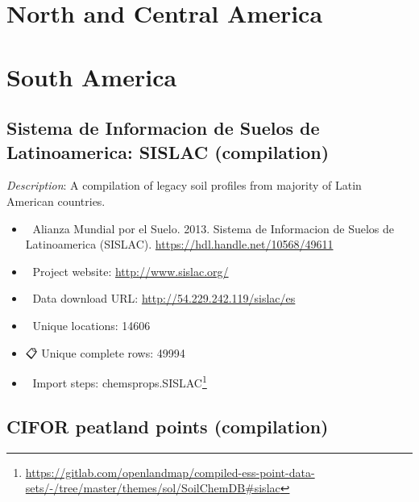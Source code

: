 \documentclass[
  graybox,natbib,nospthms]{svmono}
\providecommand{\tightlist}{%
  \setlength{\itemsep}{0pt}\setlength{\parskip}{0pt}}
\providecommand{\tightlist}{\setlength{\itemsep}{0pt}\setlength{\parskip}{0pt}}
\renewcommand{\href}[2]{#2 (\url{#1})}
\renewcommand{\href}[2]{#2\footnote{\url{#1}}}
\begin{document}
\hypertarget{north-and-central-america}{%
\section{North and Central America}\label{north-and-central-america}}

\hypertarget{south-america}{%
\section{South America}\label{south-america}}

\hypertarget{sistema-de-informacion-de-suelos-de-latinoamerica-sislac-compilation}{%
\subsection{Sistema de Informacion de Suelos de Latinoamerica: SISLAC (compilation)}\label{sistema-de-informacion-de-suelos-de-latinoamerica-sislac-compilation}}

\emph{Description}: A compilation of legacy soil profiles from majority of Latin American
countries.

\begin{itemize}
\tightlist
\item
  📕 Alianza Mundial por el Suelo. 2013. Sistema de Informacion de Suelos de Latinoamerica (SISLAC). \url{https://hdl.handle.net/10568/49611}\\
\item
  🔗 Project website: \url{http://www.sislac.org/}\\
\item
  📂 Data download URL: \url{http://54.229.242.119/sislac/es}\\
\item
  📍 Unique locations: 14606\\
\item
  📋 Unique complete rows: 49994\\
\item
  📝 Import steps: \href{https://gitlab.com/openlandmap/compiled-ess-point-data-sets/-/tree/master/themes/sol/SoilChemDB\#sislac}{chemsprops.SISLAC}
\end{itemize}

\hypertarget{cifor-peatland-points-compilation}{%
\subsection{CIFOR peatland points (compilation)}\label{cifor-peatland-points-compilation}}
\end{document}
